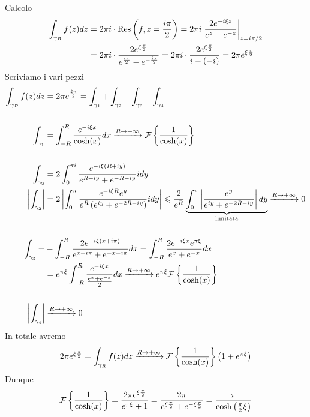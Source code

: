 Calcolo
\begin{equation*}
\begin{aligned}
\int _{\gamma _{R}} f(z)dz & = 2\pi i\cdot \operatorname{Res} \left(f,z = \frac{i\pi }{2}\right) = 2\pi i\left. \frac{2e^{ - i\xi z}}{e^{z} - e^{ - z}}\right| _{z = i\pi /2}\\
 & = 2\pi i\cdot \frac{2e^{\xi \frac{\pi }{2}}}{e^{\frac{i\pi }{2}} - e^{ - \frac{i\pi }{2}}} = 2\pi i\cdot \frac{2e^{\xi \frac{\pi }{2}}}{i - (- i)} = 2\pi e^{\xi \frac{\pi }{2}}
\end{aligned}
\end{equation*}
Scriviamo i vari pezzi
\begin{align*}
\int _{\gamma _{R}} f(z) dz & = 2\pi e^{\frac{\xi \pi }{2}} = \int _{\gamma _{1}} + \int _{\gamma _{2}} + \int _{\gamma _{3}} + \int _{\gamma _{4}}\\
 & \\
\int _{\gamma _{1}} & = \int ^{R}_{ - R}\frac{e^{ - i\xi x}}{\cosh (x)} dx\xrightarrow{R\rightarrow + \infty }\mathcal{F} \left\{\frac{1}{\cosh (x)}\right\}\\
 & \\
\int _{\gamma _{2}} & = 2\int ^{\pi i}_{0}\frac{e^{ - i\xi (R + iy)}}{e^{R + iy} + e^{ - R - iy}} idy\\
\left| \int _{\gamma _{2}}\right|  & = 2\left| \int ^{\pi }_{0}\frac{e^{ - i\xi R} e^{y}}{e^{R}\left(e^{iy} + e^{ - 2R - iy}\right)} idy\right| \leqslant \frac{2}{e^{R}}\underbrace{\int ^{\pi }_{0}\left| \frac{e^{y}}{e^{iy} + e^{ - 2R - iy}}\right| dy}_{\text{limitata}}\xrightarrow{R\rightarrow + \infty } 0\\
 & \\
\int _{\gamma _{3}} = & - \int ^{R}_{ - R}\frac{2e^{ - i\xi (x + i\pi)}}{e^{x + i\pi } + e^{ - x - i\pi }} dx = \int ^{R}_{ - R}\frac{2e^{ - i\xi x} e^{\pi \xi }}{e^{x} + e^{ - x}} dx\\
 & = e^{\pi \xi }\int ^{R}_{ - R}\frac{e^{ - i\xi x}}{\frac{e^{x} + e^{ - x}}{2}} dx\xrightarrow{R\rightarrow + \infty } e^{\pi \xi }\mathcal{F} \left\{\frac{1}{\cosh (x)}\right\}\\
 & \\
\left| \int _{\gamma _{4}}\right|  & \xrightarrow{R\rightarrow + \infty } 0
\end{align*}
In totale avremo
\begin{equation*}
2\pi e^{\xi \frac{\pi }{2}} = \int _{\gamma _{R}} f(z) dz\xrightarrow{R\rightarrow + \infty }\mathcal{F} \left\{\frac{1}{\cosh (x)}\right\}\left(1 + e^{\pi \xi }\right)
\end{equation*}
Dunque
\begin{equation*}
\mathcal{F} \left\{\frac{1}{\cosh (x)}\right\} = \frac{2\pi e^{\xi \frac{\pi }{2}}}{e^{\pi \xi } + 1} = \frac{2\pi }{e^{\xi \frac{\pi }{2}} + e^{ - \xi \frac{\pi }{2}}} = \frac{\pi }{\cosh\left(\frac{\pi }{2} \xi \right)}
\end{equation*}
\Soluzione

